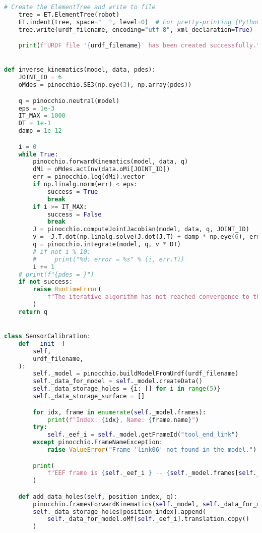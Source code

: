 \begin{lstlisting}[language=python, caption=\raggedright{calibration/sensor\_calibration.py}, frame=single]
    # Create the ElementTree and write to file
    tree = ET.ElementTree(robot)
    ET.indent(tree, space="  ", level=0)  # For pretty-printing (Python 3.9+)
    tree.write(urdf_filename, encoding="utf-8", xml_declaration=True)

    print(f"URDF file '{urdf_filename}' has been created successfully.")


def inverse_kinematics(model, data, pdes):
    JOINT_ID = 6
    oMdes = pinocchio.SE3(np.eye(3), np.array(pdes))

    q = pinocchio.neutral(model)
    eps = 1e-3
    IT_MAX = 1000
    DT = 1e-1
    damp = 1e-12

    i = 0
    while True:
        pinocchio.forwardKinematics(model, data, q)
        dMi = oMdes.actInv(data.oMi[JOINT_ID])
        err = pinocchio.log(dMi).vector
        if np.linalg.norm(err) < eps:
            success = True
            break
        if i >= IT_MAX:
            success = False
            break
        J = pinocchio.computeJointJacobian(model, data, q, JOINT_ID)
        v = -J.T.dot(np.linalg.solve(J.dot(J.T) + damp * np.eye(6), err))
        q = pinocchio.integrate(model, q, v * DT)
        # if not i % 10:
        #     print("%d: error = %s" % (i, err.T))
        i += 1
    # print(f"{pdes = }")
    if not success:
        raise RuntimeError(
            f"The iterative algorithm has not reached convergence to the desired precision, {np.linalg.norm(err) = }"
        )
    return q


class SensorCalibration:
    def __init__(
        self,
        urdf_filename,
    ):
        self._model = pinocchio.buildModelFromUrdf(urdf_filename)
        self._data_for_model = self._model.createData()
        self._data_storage_holes = {i: [] for i in range(5)}
        self._data_storage_surface = []

        for idx, frame in enumerate(self._model.frames):
            print(f"Index: {idx}, Name: {frame.name}")
        try:
            self._eef_i = self._model.getFrameId("tool_end_link")
        except pinocchio.FrameNameException:
            raise ValueError("Frame 'link06' not found in the model.")

        print(
            f"EEF frame is {self._eef_i } -- {self._model.frames[self._eef_i].name}"
        )

    def add_data_holes(self, position_index, q):
        pinocchio.framesForwardKinematics(self._model, self._data_for_model, q)
        self._data_storage_holes[position_index].append(
            self._data_for_model.oMf[self._eef_i].translation.copy()
        )


\end{lstlisting}
